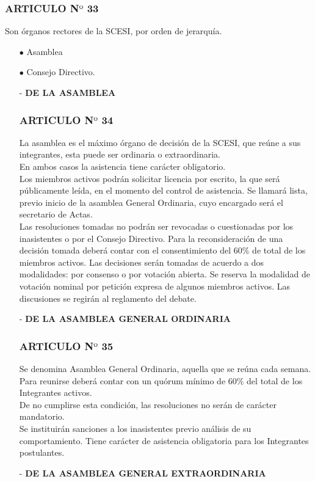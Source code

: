 \documentclass[letterpaper,11pt]{book}
\begin{document}
\subsubsection*{ARTICULO N$º$ 33}
Son órganos rectores de la SCESI, por orden de jerarquía. 
\begin{itemize}
\item[$\bullet$] Asamblea  
\item[$\bullet$] Consejo Directivo. 
\end{itemize}
\begin{itemize}
\item[-] {\bf DE LA ASAMBLEA}
\subsubsection*{ARTICULO N$º$ 34}
La asamblea es el máximo órgano de decisión de la SCESI, que reúne a sus integrantes,  esta puede ser ordinaria o extraordinaria.\\
En ambos casos la asistencia tiene carácter obligatorio.\\
Los miembros activos podrán solicitar licencia por escrito, la que será públicamente leída, en el momento del control de asistencia. Se llamará lista, previo inicio de la asamblea General Ordinaria, cuyo encargado será el secretario de Actas.\\
Las resoluciones tomadas no podrán ser revocadas o cuestionadas por los inasistentes o por el Consejo Directivo. Para la reconsideración de una decisión tomada deberá contar con el consentimiento del 60\% de total de los miembros activos. Las decisiones serán tomadas de acuerdo a dos modalidades: por consenso o por votación abierta. Se reserva la modalidad de votación nominal por petición expresa de algunos miembros activos. Las discusiones se regirán al reglamento del debate.
\item[-] {\bf DE LA ASAMBLEA GENERAL ORDINARIA}
\subsubsection*{ARTICULO N$º$ 35}
Se denomina Asamblea General Ordinaria, aquella que se reúna cada semana. 
Para reunirse deberá contar con un quórum mínimo de 60\% del total de los Integrantes activos.\\
De no cumplirse esta condición, las resoluciones no serán de carácter mandatorio.\\
Se instituirán sanciones a los inasistentes previo análisis de su comportamiento. Tiene carácter de asistencia obligatoria para los Integrantes postulantes.
\item[-] {\bf DE LA ASAMBLEA GENERAL EXTRAORDINARIA}

\end{itemize}
\end{document}
